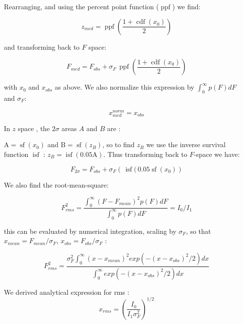 \documentclass[fleqn,usenatbib]{mnras}  %
\DeclareMathOperator\cdf{cdf}
\DeclareMathOperator\sf{sf}
\DeclareMathOperator\isf{isf}
\DeclareMathOperator\ppf{ppf}
\begin{document}
Rearranging, and using the percent point function ($\ppf$)  we find:

\begin{equation}
z_{med} = \ppf \left( \frac{1+\cdf(x_{0})}{2} \right)
\end{equation}

and transforming back to $F$ space: 

\begin{equation}
F_{med} = F_{obs} + \sigma_{F} \, \ppf \left( \frac{1+\cdf(x_{0})}{2} \right)
\end{equation}

with $x_{0}$ and $x_{obs}$ as above.  We also normalize this expression by $\int _{0} ^ {\infty}{ p(F) dF}$ and $\sigma_{F}$:

\begin{equation}
x_{med}^{norm} = x_{obs}
\end{equation}


\bigskip

In $z$  space , the $2\sigma$ areas  $A$ and $B$ are :

$\text{A} = \sf(x_{0})$ and $\text{B} = \sf(z_{B})$, so to find  $z_{B}$ we use the  inverse survival function $\isf$ : $z_{B} = \isf(0.05 \text{A})$. Thus transforming back to $F$-space we have:

\begin{equation}
F_{2\sigma} = F_{obs} + \sigma_{F} \left(\, \isf (\, 0.05 \sf (x_{0})  \right)
\end{equation}

\bigskip

We also find the root-mean-square:

\begin{equation}
F_{rms}^{2} = \frac{\int _{0} ^ {\infty}{(F-F_{mean})^{2} p(F) dF}}{\int _{0} ^ {\infty}{p(F) dF}} = I_{0} / I_{1}
\end{equation}

this can be evaluated by numerical integration, scaling by $\sigma_{F}$, so that $x_{mean} = F_{mean} / \sigma_{F}$, $x_{obs} = F_{obs} / \sigma_{F}$ : 

\begin{equation}
F_{rms}^{2} = \frac{\sigma_{F}^{2} \int_{0}^{\infty} {(x-x_{mean})^{2} exp(-(x-x_{obs})^{2} / 2 ) dx }}  {\int_{0}^{\infty} {exp(-(x-x_{obs})^{2} / 2 ) dx }}
\end{equation}

We derived analytical expression for rms :
\begin{equation}
x_{rms} = \left(\frac{I_{0}}{I_{1} \sigma_{F}^{2}}\right)^{1/2}
\end{equation}
\end{document}
